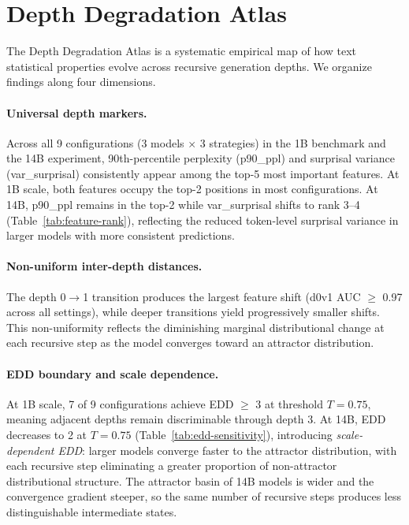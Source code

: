 \documentclass[11pt,a4paper]{article}
\begin{document}
\section{Depth Degradation Atlas}

The Depth Degradation Atlas is a systematic empirical map of how text statistical properties evolve across recursive generation depths. We organize findings along four dimensions.

\paragraph{Universal depth markers.}
Across all 9 configurations (3 models $\times$ 3 strategies) in the 1B benchmark and the 14B experiment, 90th-percentile perplexity (p90\_ppl) and surprisal variance (var\_surprisal) consistently appear among the top-5 most important features. At 1B scale, both features occupy the top-2 positions in most configurations. At 14B, p90\_ppl remains in the top-2 while var\_surprisal shifts to rank 3--4 (Table~\ref{tab:feature-rank}), reflecting the reduced token-level surprisal variance in larger models with more consistent predictions.

\paragraph{Non-uniform inter-depth distances.}
The depth 0$\to$1 transition produces the largest feature shift (d0v1 AUC $\geq$ 0.97 across all settings), while deeper transitions yield progressively smaller shifts. This non-uniformity reflects the diminishing marginal distributional change at each recursive step as the model converges toward an attractor distribution.

\paragraph{EDD boundary and scale dependence.}
At 1B scale, 7 of 9 configurations achieve EDD $\geq$ 3 at threshold $T = 0.75$, meaning adjacent depths remain discriminable through depth 3. At 14B, EDD decreases to 2 at $T = 0.75$ (Table~\ref{tab:edd-sensitivity}), introducing \emph{scale-dependent EDD}: larger models converge faster to the attractor distribution, with each recursive step eliminating a greater proportion of non-attractor distributional structure. The attractor basin of 14B models is wider and the convergence gradient steeper, so the same number of recursive steps produces less distinguishable intermediate states.
\end{document}
